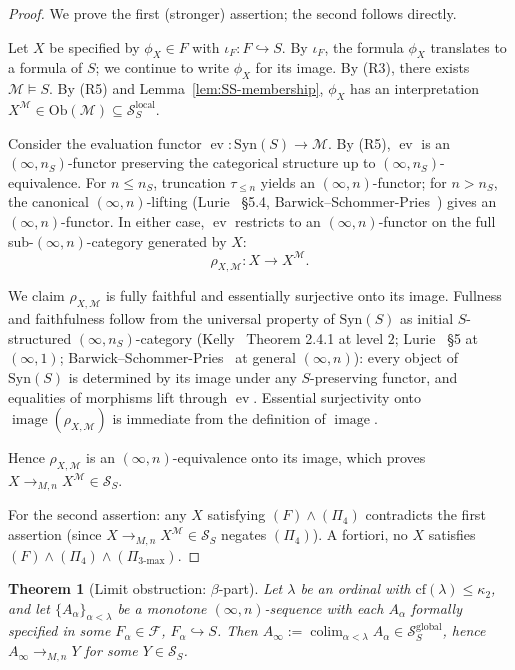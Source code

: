 \documentclass[11pt]{article}
\theoremstyle{plain}
\newtheorem{theorem}{Theorem}[section]
\theoremstyle{definition}
\newcommand{\cS}{\mathcal{S}}
\newcommand{\cF}{\mathcal{F}}
\newcommand{\cM}{\mathcal{M}}
\newcommand{\Ob}{\mathrm{Ob}}
\newcommand{\Syn}{\mathrm{Syn}}
\DeclareMathOperator{\colim}{colim}
\DeclareMathOperator{\image}{image}
\DeclareMathOperator{\ev}{ev}
\begin{document}
\begin{proof}
We prove the first (stronger) assertion; the second follows directly.

Let $X$ be specified by $\phi_X \in F$ with $\iota_F : F \hookrightarrow S$. By $\iota_F$, the formula $\phi_X$ translates to a formula of $S$; we continue to write $\phi_X$ for its image. By (R3), there exists $\cM \models S$. By (R5) and Lemma~\ref{lem:SS-membership}, $\phi_X$ has an interpretation $X^\cM \in \Ob(\cM) \subseteq \cS_S^{\mathrm{local}}$.

Consider the evaluation functor $\ev : \Syn(S) \to \cM$. By (R5), $\ev$ is an $(\infty, n_S)$-functor preserving the categorical structure up to $(\infty, n_S)$-equivalence. For $n \leq n_S$, truncation $\tau_{\leq n}$ yields an $(\infty, n)$-functor; for $n > n_S$, the canonical $(\infty, n)$-lifting (Lurie~\cite{LurieHTT} \S 5.4, Barwick--Schommer-Pries~\cite{BarwickSchommerPries2021}) gives an $(\infty, n)$-functor. In either case, $\ev$ restricts to an $(\infty, n)$-functor on the full sub-$(\infty, n)$-category generated by $X$:
\[ \rho_{X, \cM} : X \longrightarrow X^\cM. \]

We claim $\rho_{X, \cM}$ is fully faithful and essentially surjective onto its image. Fullness and faithfulness follow from the universal property of $\Syn(S)$ as initial $S$-structured $(\infty, n_S)$-category (Kelly~\cite{Kelly1982} Theorem 2.4.1 at level $2$; Lurie~\cite{LurieHTT} \S 5 at $(\infty, 1)$; Barwick--Schommer-Pries~\cite{BarwickSchommerPries2021} at general $(\infty, n)$): every object of $\Syn(S)$ is determined by its image under any $S$-preserving functor, and equalities of morphisms lift through $\ev$. Essential surjectivity onto $\image(\rho_{X, \cM})$ is immediate from the definition of $\image$.

Hence $\rho_{X, \cM}$ is an $(\infty, n)$-equivalence onto its image, which proves $X \to_{M, n} X^\cM \in \cS_S$.

For the second assertion: any $X$ satisfying $(F) \wedge (\Pi_4)$ contradicts the first assertion (since $X \to_{M, n} X^\cM \in \cS_S$ negates $(\Pi_4)$). A fortiori, no $X$ satisfies $(F) \wedge (\Pi_4) \wedge (\Pi_{3\text{-max}})$.
\end{proof}

\begin{theorem}[Limit obstruction: $\beta$-part]\label{thm:afnt-beta}
Let $\lambda$ be an ordinal with $\mathrm{cf}(\lambda) \leq \kappa_2$, and let $\{A_\alpha\}_{\alpha < \lambda}$ be a monotone $(\infty, n)$-sequence with each $A_\alpha$ formally specified in some $F_\alpha \in \cF$, $F_\alpha \hookrightarrow S$. Then $A_\infty := \colim_{\alpha < \lambda} A_\alpha \in \cS_S^{\mathrm{global}}$, hence $A_\infty \to_{M, n} Y$ for some $Y \in \cS_S$.
\end{theorem}
\end{document}
